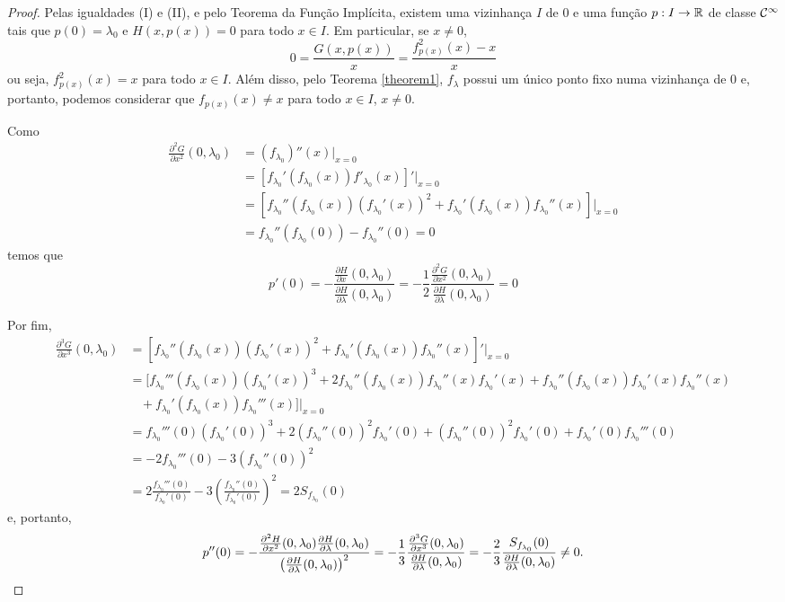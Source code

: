 \begin{proof}
Pelas igualdades (I) e (II), e pelo Teorema da Função Implícita, existem uma vizinhança $I$ de $0$ e uma função $p: I \to \mathbb{R}$ de classe $\mathcal{C}^\infty$ tais que $p(0) = \lambda_0$ e $H(x, p(x)) = 0$ para todo $x \in I$. Em particular, se $x \neq 0$,
$$0 = \frac{G(x, p(x))}{x} = \frac{f^2_{p(x)}(x) - x}{x}$$
ou seja, $f^2_{p(x)}(x) = x$ para todo $x \in I$. Além disso, pelo Teorema \ref{theorem1}, $f_\lambda$ possui um único ponto fixo numa vizinhança de $0$ e, portanto, podemos considerar que $f_{p(x)}(x) \neq x$ para todo $x \in I$, $x \neq 0$.

Como
\begin{align*}
\frac{\partial^2 G}{\partial x^2}(0, \lambda_0) & = (f_{\lambda_0})''(x)|_{x = 0} \\
& = [f_{\lambda_0}'(f_{\lambda_0}(x)) f'_{\lambda_0}(x)]'|_{x = 0} \\
& = [f_{\lambda_0}''(f_{\lambda_0}(x))(f_{\lambda_0}'(x))^2 + f_{\lambda_0}'(f_{\lambda_0}(x))f_{\lambda_0}''(x)]|_{x = 0} \\
& = f_{\lambda_0}''(f_{\lambda_0}(0)) - f_{\lambda_0}''(0) = 0
\end{align*} temos que
$$p'(0) = -\frac{\frac{\partial H}{\partial x}(0, \lambda_0) }{\frac{\partial H }{\partial \lambda}(0, \lambda_0)} = -\frac{1}{2} \frac{\frac{\partial^2 G}{\partial x^2}(0, \lambda_0) }{\frac{\partial H }{\partial \lambda}(0, \lambda_0)} = 0$$

Por fim,
\begin{align*}
\frac{\partial^3 G}{\partial x^3}(0, \lambda_0) & = [f_{\lambda_0}''(f_{\lambda_0}(x))(f_{\lambda_0}'(x))^2
+ f_{\lambda_0}'(f_{\lambda_0}(x))f_{\lambda_0}''(x)]'|_{x = 0} \\
& = [f_{\lambda_0}'''(f_{\lambda_0}(x))(f_{\lambda_0}'(x))^3
+ 2f_{\lambda_0}''(f_{\lambda_0}(x))f_{\lambda_0}''(x)f_{\lambda_0}'(x)
+ f_{\lambda_0}''(f_{\lambda_0}(x)) f_{\lambda_0}'(x)f_{\lambda_0}''(x) \\
& \ \ \ \ + f_{\lambda_0}'(f_{\lambda_0}(x))f_{\lambda_0}'''(x)]|_{x = 0} \\
& = f_{\lambda_0}'''(0)(f_{\lambda_0}'(0))^3  + 2(f_{\lambda_0}''(0))^2f_{\lambda_0}'(0) + (f_{\lambda_0}''(0))^2f_{\lambda_0}'(0) + f_{\lambda_0}'(0)f_{\lambda_0}'''(0) \\
& = -2 f_{\lambda_0}'''(0) - 3(f_{\lambda_0}''(0))^2 \\
& = 2\frac{f_{\lambda_0}'''(0)}{f_{\lambda_0}'(0)} - 3\left( \frac{f_{\lambda_0}''(0)}{f_{\lambda_0}'(0)} \right)^2 = 2 S_{f_{\lambda_0}}(0)
\end{align*}
e, portanto,
$$ p''(0) = - \frac{\frac{\partial^2 H}{\partial x^2}(0, \lambda_0)\frac{\partial H}{\partial \lambda}(0, \lambda_0)}{ \left( \frac{ \partial H}{\partial \lambda}(0, \lambda_0) \right)^2} \\
= -\frac{1}{3} \frac{\frac{\partial^3 G}{\partial x^3}(0, \lambda_0)}{\frac{\partial H}{\partial \lambda}(0, \lambda_0)} = -\frac{2}{3} \frac{S_{f_{\lambda_0}}(0)}{\frac{\partial H}{\partial \lambda}(0, \lambda_0)} \neq 0.$$
\end{proof}